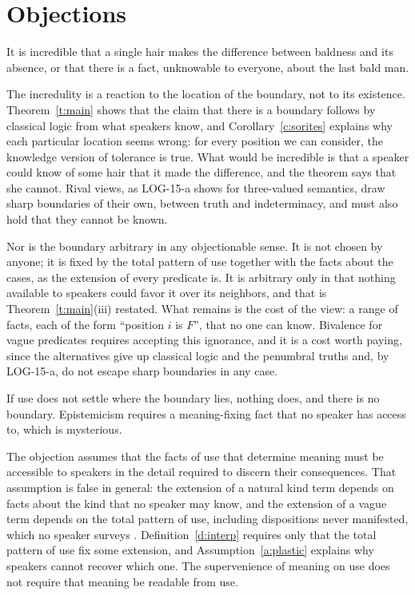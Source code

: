 \documentclass{situationist-preprint}
\begin{document}
\section{Objections}\label{s:obj}

\begin{objection}[Incredulity]\label{o:incred}
It is incredible that a single hair makes the difference between baldness and its absence, or that there is a fact, unknowable to everyone, about the last bald man.
\end{objection}

\begin{reply}
The incredulity is a reaction to the location of the boundary, not to its existence. Theorem~\ref{t:main} shows that the claim that there is a boundary follows by classical logic from what speakers know, and Corollary~\ref{c:sorites} explains why each particular location seems wrong: for every position we can consider, the knowledge version of tolerance is true. What would be incredible is that a speaker could know of some hair that it made the difference, and the theorem says that she cannot. Rival views, as LOG-15-a shows for three-valued semantics, draw sharp boundaries of their own, between truth and indeterminacy, and must also hold that they cannot be known.

Nor is the boundary arbitrary in any objectionable sense. It is not chosen by anyone; it is fixed by the total pattern of use together with the facts about the cases, as the extension of every predicate is. It is arbitrary only in that nothing available to speakers could favor it over its neighbors, and that is Theorem~\ref{t:main}(iii) restated. What remains is the cost of the view: a range of facts, each of the form \enquote{position $i$ is $F$}, that no one can know. Bivalence for vague predicates requires accepting this ignorance, and it is a cost worth paying, since the alternatives give up classical logic and the penumbral truths and, by LOG-15-a, do not escape sharp boundaries in any case.
\end{reply}

\begin{objection}
If use does not settle where the boundary lies, nothing does, and there is no boundary. Epistemicism requires a meaning-fixing fact that no speaker has access to, which is mysterious.
\end{objection}

\begin{reply}
The objection assumes that the facts of use that determine meaning must be accessible to speakers in the detail required to discern their consequences. That assumption is false in general: the extension of a natural kind term depends on facts about the kind that no speaker may know, and the extension of a vague term depends on the total pattern of use, including dispositions never manifested, which no speaker surveys \citep[ch.~7]{Williamson1994}. Definition~\ref{d:interp} requires only that the total pattern of use fix some extension, and Assumption~\ref{a:plastic} explains why speakers cannot recover which one. The supervenience of meaning on use does not require that meaning be readable from use.
\end{reply}
\end{document}
